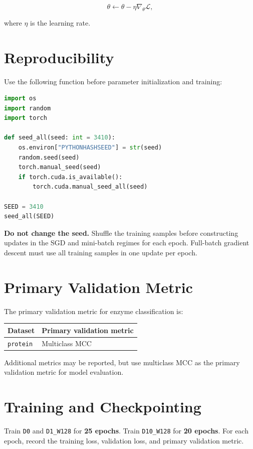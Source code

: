 \documentclass[11pt,a4paper]{article}
\newcommand{\code}[1]{\texttt{#1}}
\begin{document}
\[
\theta \leftarrow \theta-\eta\nabla_{\theta}\mathcal{L},
\]

where $\eta$ is the learning rate.

\section{Reproducibility}

Use the following function before parameter initialization and training:

\begin{lstlisting}[language=Python]
import os
import random
import torch

def seed_all(seed: int = 3410):
    os.environ["PYTHONHASHSEED"] = str(seed)
    random.seed(seed)
    torch.manual_seed(seed)
    if torch.cuda.is_available():
        torch.cuda.manual_seed_all(seed)

SEED = 3410
seed_all(SEED)
\end{lstlisting}

\textbf{Do not change the seed.} Shuffle the training samples before constructing updates in the SGD and mini-batch regimes for each epoch. Full-batch gradient descent must use all training samples in one update per epoch.

\section{Primary Validation Metric}

The primary validation metric for enzyme classification is:

\begin{center}
\begin{tabular}{ll}
\toprule
\textbf{Dataset} & \textbf{Primary validation metric} \\
\midrule
\code{protein} & Multiclass MCC \\
\bottomrule
\end{tabular}
\end{center}

Additional metrics may be reported, but use multiclass MCC as the primary validation metric for model evaluation.

\section{Training and Checkpointing}

Train \code{D0} and \code{D1\_W128} for \textbf{25 epochs}. Train \code{D10\_W128} for \textbf{20 epochs}. For each epoch, record the training loss, validation loss, and primary validation metric.
\end{document}
